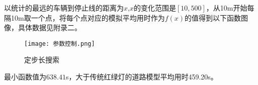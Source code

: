 \documentclass[a4paper,12pt]{article}
\numberwithin{equation}{section}
\newcommand{\upcite}[1]{\textsuperscript{\textsuperscript{\cite{#1}}}}
\begin{document}
		以统计的最远的车辆到停止线的距离为$x$,$x$的变化范围是$[10,500]$，从10m开始每隔10m取一个点，将每个点对应的模拟平均用时作为$f(x)$的值得到以下函数图像，具体数据见附录二。
		\begin{figure}[H]
			\centering
			\texttt{[image: 参数控制.png]}\caption{定步长搜索}
			\label{参数控制}
		\end{figure}
	最小函数值为$638.41$s，大于传统红绿灯的道路模型平均用时459.20s\upcite{ref3,ref9}。
\end{document}

